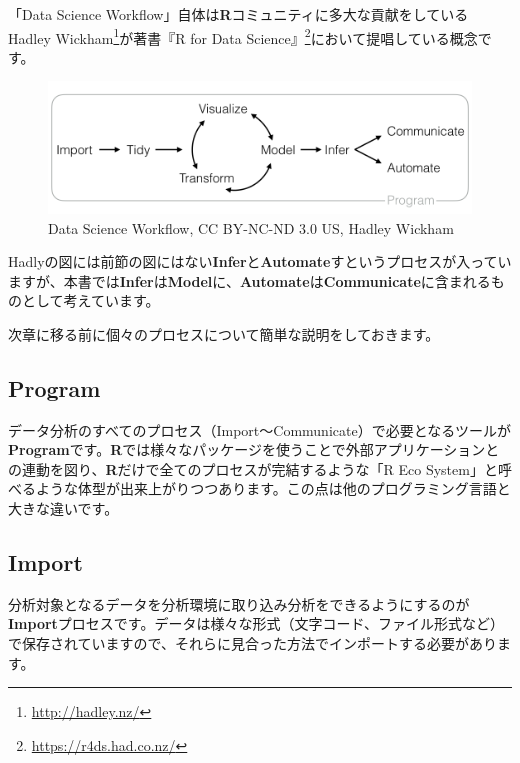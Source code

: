 \documentclass[
  12pt,
]{book}
\DeclareRobustCommand{\href}[2]{#2\footnote{\url{#1}}}
\begin{document}
「Data Science Workflow」自体は\textbf{R}コミュニティに多大な貢献をしている \href{http://hadley.nz/}{Hadley Wickham}が著書\href{https://r4ds.had.co.nz/}{『R for Data Science』}において提唱している概念です。

\begin{figure}[H]

{\centering \includegraphics[width=0.9\linewidth,]{fig/data-science} 

}

\caption{Data Science Workflow, CC BY-NC-ND 3.0 US, Hadley Wickham}\label{fig:unnamed-chunk-11}
\end{figure}

Hadlyの図には前節の図にはない\textbf{Infer}と\textbf{Automate}すというプロセスが入っていますが、本書では\textbf{Infer}は\textbf{Model}に、\textbf{Automate}は\textbf{Communicate}に含まれるものとして考えています。

次章に移る前に個々のプロセスについて簡単な説明をしておきます。

\hypertarget{program}{%
\subsection*{Program}\label{program}}

データ分析のすべてのプロセス（Import〜Communicate）で必要となるツールが\textbf{Program}です。\textbf{R}では様々なパッケージを使うことで外部アプリケーションとの連動を図り、\textbf{R}だけで全てのプロセスが完結するような「R Eco System」と呼べるような体型が出来上がりつつあります。この点は他のプログラミング言語と大きな違いです。

\hypertarget{import}{%
\subsection*{Import}\label{import}}

分析対象となるデータを分析環境に取り込み分析をできるようにするのが\textbf{Import}プロセスです。データは様々な形式（文字コード、ファイル形式など）で保存されていますので、それらに見合った方法でインポートする必要があります。
\end{document}
